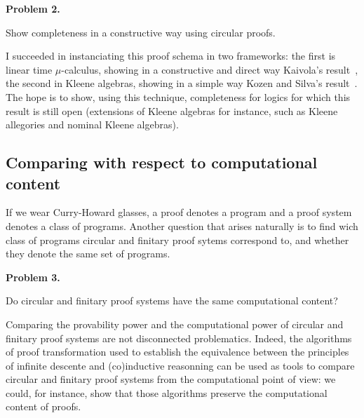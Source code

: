 \documentclass{article}
\begin{document}
\begin{center}
\begin{bclogo}[logo= ,arrondi = 0.1, couleur = green!10,  epBarre = 0]{}
  \vspace{-10pt}
  \textbf{Problem 2.}

Show completeness in a constructive way using circular proofs. 
\end{bclogo}
\end{center}

I succeeded in instanciating this proof schema in two  frameworks: the first is  linear time $\mu$-calculus, showing in a constructive and direct way Kaivola's result~\cite{}, the second in Kleene algebras, showing in a simple way Kozen and Silva's result~\cite{}. The hope is to show, using this technique, completeness for logics for which this result is still open (extensions of Kleene algebras for instance, such as Kleene allegories and nominal Kleene
algebras).   
  

\subsection{Comparing with respect to computational content}

If we wear Curry-Howard glasses, a proof denotes a program and a proof system denotes a class
of programs. Another question that arises naturally is to find wich class of programs circular and finitary proof sytems correspond to, and whether they denote the same set of programs.
 
\begin{center}
\begin{bclogo}[logo= ,arrondi = 0.1, couleur = green!10,  epBarre = 0]{}
  \vspace{-10pt}
  \textbf{Problem 3.}

Do circular and finitary proof systems have the same computational content?
\end{bclogo}
\end{center}

Comparing the provability power and the computational power of  circular and finitary proof systems are not disconnected problematics. Indeed, the algorithms of proof transformation used to establish the equivalence between the principles of infinite descente and (co)inductive reasonning can be used as tools to compare circular and finitary proof systems from the computational point of view: we could, for instance, show that those algorithms preserve the computational content of proofs.   
\end{document}
